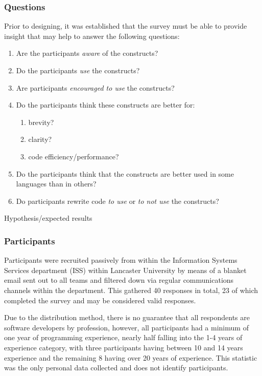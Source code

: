 \documentclass{article}
\begin{document}
        \subsubsection{Questions}
        \label{subsec:surveyQuestions}
            Prior to designing, it was established that the survey must be able to provide insight that may help to answer the following questions:
            \begin{enumerate}
                \item Are the participants \emph{aware} of the constructs?
                \item Do the participants \emph{use} the constructs?
                \item Are participants \emph{encouraged to use} the constructs?
                \item Do the participants think these constructs are better for:
                \begin{enumerate}
                    \item brevity?
                    \item clarity?
                    \item code efficiency/performance?
                \end{enumerate}  
                \item Do the participants think that the constructs are better used in some languages than in others?
                \item Do participants rewrite code \emph{to use} or \emph{to not use} the constructs?
            \end{enumerate}
            
            Hypothesis/expected results
        \subsubsection{Participants}
            Participants were recruited passively from within the Information Systems Services department (ISS) within Lancaster University by means of a blanket email sent out to all teams and filtered down via regular communications channels within the department. This gathered 40 responses in total, 23 of which completed the survey and may be considered valid responses.
            
            Due to the distribution method, there is no guarantee that all respondents are software developers by profession, however, all participants had a minimum of one year of programming experience, nearly half falling into the 1-4 years of experience category, with three participants having between 10 and 14 years experience and the remaining 8 having over 20 years of experience. This statistic was the only personal data collected and does not identify participants.
\end{document}
